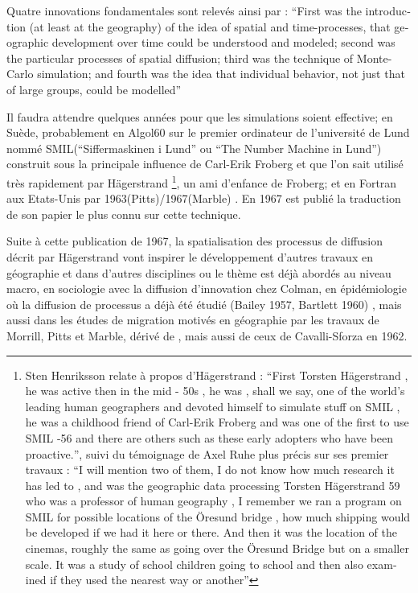 Quatre innovations fondamentales sont relevés ainsi par \textcite{Morril2005} : \foreignquote{english}{First was the introduction (at least at the geography) of the idea of spatial and time-processes, that geographic development over time could be understood and modeled; second was the particular processes of spatial diffusion; third was the technique of Monte-Carlo simulation; and fourth was the idea that individual behavior, not just that of large groups, could be modelled} 

Il faudra attendre quelques années pour que les simulations soient effective; en Suède, probablement en Algol60 sur le premier ordinateur de l'université de Lund nommé SMIL(\foreignquote{sweden}{Siffermaskinen i Lund} ou \foreignquote{english}{The Number Machine in Lund}) construit sous la principale influence de Carl-Erik Froberg et que l'on sait utilisé très rapidement par Hägerstrand \footnote{\autocite[32-33]{Lindgren2008} Sten Henriksson relate à propos d'Hägerstrand : \foreignquote{english}{First Torsten Hägerstrand , he was active then in the mid - 50s , he was , shall we say, one of the world's leading human geographers and devoted himself to simulate stuff on SMIL , he was a childhood friend of Carl-Erik Froberg and was one of the first to use SMIL -56 and there are others such as these early adopters who have been proactive.}, suivi du témoignage de Axel Ruhe plus précis sur ses premier travaux : \foreignquote{english}{I will mention two of them, I do not know how much research it has led to , and was the geographic data processing Torsten Hägerstrand 59 who was a professor of human geography , I remember we ran a program on SMIL for possible locations of the Öresund bridge , how much shipping would be developed if we had it here or there. And then it was the location of the cinemas, roughly the same as going over the Öresund Bridge but on a smaller scale. It was a study of school children going to school and then also examined if they used the nearest way or another}}, un ami d'enfance de Froberg; et en Fortran aux Etats-Unis par 1963(Pitts)/1967(Marble) \autocite{Morril2005, Marble1972, Pitts1963}. En 1967 \autocite{Hagerstrand1967a} est publié la traduction de son papier le plus connu sur cette technique. 

Suite à cette publication de 1967, la spatialisation des processus de diffusion décrit par Hägerstrand vont inspirer le développement d'autres travaux en géographie et dans d'autres disciplines ou le thème est déjà abordés au niveau macro, en sociologie avec la diffusion d'innovation chez Colman, en épidémiologie \autocite{Cliff1981, Cliff2000} où la diffusion de processus a déjà été étudié (Bailey 1957, Bartlett 1960) \textcite{Pitts1963, Morrill1968}, mais aussi dans les études de migration motivés en géographie par les travaux de Morrill, Pitts et Marble, dérivé de \autocite{Wolpert1965}, mais aussi de ceux de Cavalli-Sforza en 1962. 


